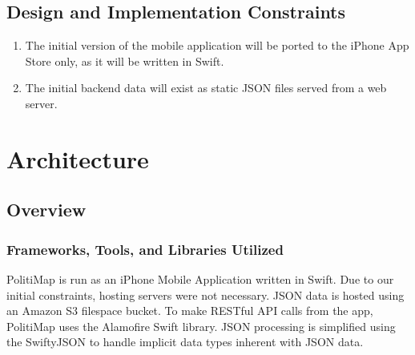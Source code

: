 \documentclass[12pt,oneside,letterpaper]{article}
\newcounter{use_case}
\begin{document}
% 

\subsection{Design and Implementation Constraints}
\begin{enumerate}
\item The initial version of the mobile application will be ported to
the iPhone App Store only, as it will be written in Swift.
\item The initial backend data will exist as static JSON files
  served from a web server.
\end{enumerate}

% 

\section{Architecture}
% 
\subsection{Overview}
\subsubsection{Frameworks, Tools, and Libraries Utilized}
PolitiMap is run as an iPhone Mobile Application written in Swift. Due
to our initial constraints, hosting servers were not necessary. JSON data
is hosted using an Amazon S3 filespace bucket. To make RESTful API calls
from the app, PolitiMap uses the Alamofire Swift library. JSON processing
is simplified using the SwiftyJSON to handle implicit data types inherent
with JSON data.
\end{document}
